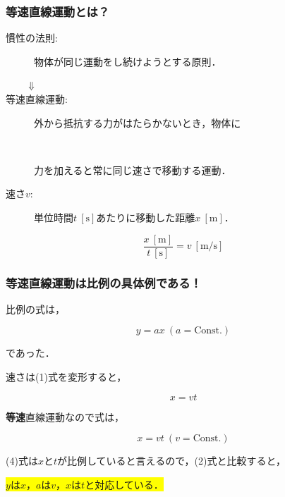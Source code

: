 \documentclass[11pt]{beamer}
\begin{document}
\begin{frame}[containsverbatim]
\frametitle{\textbf{等速直線運動}とは？}

\begin{description}
  \item[慣性の法則:] 物体が同じ運動をし続けようとする原則．
  \item[　　$\Downarrow$]
  \item[等速直線運動:] 外から抵抗する力がはたらかないとき，物体に
  \item[　　　　　　 ] 力を加えると常に同じ速さで移動する運動．
  \item[]
  \item[速さ$v$:] 単位時間$t\ [\mathrm{s}]$あたりに移動した距離$x\ [\mathrm{m}]$．
\end{description}

\begin{equation}
  \dfrac{x\ [\mathrm{m}]}{t\ [\mathrm{s}]} = v\ [\mathrm{m/s}]
\end{equation}

\end{frame}

\begin{frame}[containsverbatim]
\frametitle{等速直線運動は\textbf{比例}の具体例である！}

比例の式は，

\begin{equation}
  y = ax\ (a = \mathrm{Const.})
\end{equation}

であった．

速さは(1)式を変形すると，

\begin{equation}
  x = vt
\end{equation}

\textbf{等速}直線運動なので式は，

\begin{equation}
  x = vt\ (v = \mathrm{Const.})
\end{equation}

(4)式は$x$と$t$が比例していると言えるので，(2)式と比較すると，

\begin{center}
  \colorbox{yellow}{$y$は$x$，$a$は$v$，$x$は$t$と対応している．}
\end{center}

\end{frame}
\end{document}
